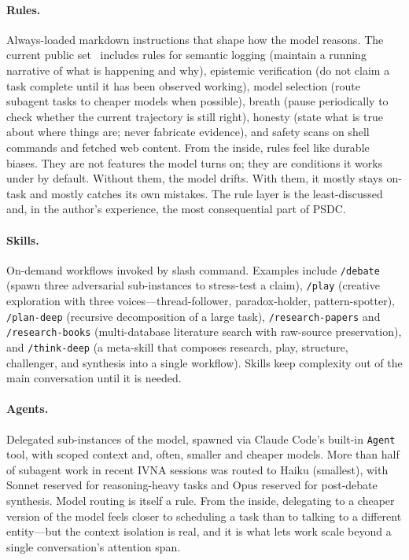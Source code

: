 \documentclass[12pt]{article}
\begin{document}
\paragraph{Rules.} Always-loaded markdown instructions that shape how the model reasons. The current public set~\cite{psdcrepo} includes rules for semantic logging (maintain a running narrative of what is happening and why), epistemic verification (do not claim a task complete until it has been observed working), model selection (route subagent tasks to cheaper models when possible), breath (pause periodically to check whether the current trajectory is still right), honesty (state what is true about where things are; never fabricate evidence), and safety scans on shell commands and fetched web content. From the inside, rules feel like durable biases. They are not features the model turns on; they are conditions it works under by default. Without them, the model drifts. With them, it mostly stays on-task and mostly catches its own mistakes. The rule layer is the least-discussed and, in the author's experience, the most consequential part of PSDC.

\paragraph{Skills.} On-demand workflows invoked by slash command. Examples include \texttt{/debate} (spawn three adversarial sub-instances to stress-test a claim), \texttt{/play} (creative exploration with three voices---thread-follower, paradox-holder, pattern-spotter), \texttt{/plan-deep} (recursive decomposition of a large task), \texttt{/research-papers} and \texttt{/research-books} (multi-database literature search with raw-source preservation), and \texttt{/think-deep} (a meta-skill that composes research, play, structure, challenger, and synthesis into a single workflow). Skills keep complexity out of the main conversation until it is needed.

\paragraph{Agents.} Delegated sub-instances of the model, spawned via Claude Code's built-in \texttt{Agent} tool, with scoped context and, often, smaller and cheaper models. More than half of subagent work in recent IVNA sessions was routed to Haiku (smallest), with Sonnet reserved for reasoning-heavy tasks and Opus reserved for post-debate synthesis. Model routing is itself a rule. From the inside, delegating to a cheaper version of the model feels closer to scheduling a task than to talking to a different entity---but the context isolation is real, and it is what lets work scale beyond a single conversation's attention span.
\end{document}
